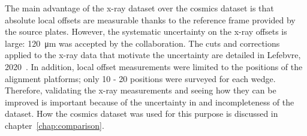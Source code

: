 The main advantage of the x-ray dataset over the cosmics dataset is that absolute local offsets are measurable thanks to the reference frame provided by the source plates. However, the systematic uncertainty on the x-ray offsets is large: \SI{120}{\micro\meter} was accepted by the collaboration. The cuts and corrections applied to the x-ray data that motivate the uncertainty are detailed in Lefebvre, 2020~\cite{lefebvre_precision_2020}. In addition, local offset measurements were limited to the positions of the alignment platforms; only 10 - 20 positions were surveyed for each wedge. Therefore, validating the x-ray measurements and seeing how they can be improved is important because of the uncertainty in and incompleteness of the dataset. How the cosmics dataset was used for this purpose is discussed in chapter~\ref{chap:comparison}. 